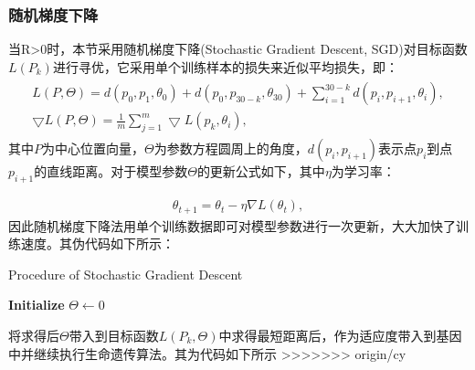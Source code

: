\documentclass{whutmod}
\begin{document}
	\subsubsection{随机梯度下降}	
    	 当R>0时，本节采用随机梯度下降(Stochastic Gradient Descent, SGD)对目标函数$L(P_k)$进行寻优，它采用单个训练样本的损失来近似平均损失，即：
    	 	    \begin{gather}
    	 \begin{matrix}
    	 L(P,\Theta)=d(p_0,p_{1},\theta_0)+d(p_0,p_{30-k},\theta_{30})+\sum_{i=1}^{30-k}d(p_i,p_{i+1},\theta_{i}) ,\\ 
    	 \bigtriangledown  L(P,\Theta)= \frac{1}{m}\sum_{j=1}^{m}\bigtriangledown L(p_k,\theta_{i}),
    	 \end{matrix}
    	 \end{gather}
    	 其中$P$为中心位置向量，$\Theta$为参数方程圆周上的角度，$d(p_i,p_{i+1})$表示点$p_i$到点$p_{i+1}$的直线距离。对于模型参数$\Theta$的更新公式如下，其中$\eta$为学习率：
    	 
    	 \begin{gather}
			\theta_{t+1}=\theta_{t}-\eta \nabla L\left(\theta_{t}\right),
    	 \end{gather}
    	 因此随机梯度下降法用单个训练数据即可对模型参数进行一次更新，大大加快了训练速度。其伪代码如下所示：
    	 
    	   	\begin{algorithm}[H]
    	 	\caption{Procedure of Stochastic Gradient Descent}
    	 	\LinesNumbered
    	 	\textbf{Initialize} $\Theta \leftarrow 0$ \newline
    	 	\Return {$\Theta$ }
    	 \end{algorithm}
		
		将求得后$\Theta$带入到目标函数$L(P_k, \Theta)$中求得最短距离后，作为适应度带入到基因中并继续执行生命遗传算法。其为代码如下所示
>>>>>>> origin/cy
		
\end{document}
